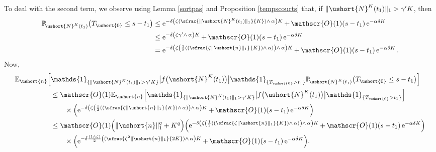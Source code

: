 \documentclass[10pt]{amsart}
\newcommand{\Psfrac}[2]{(\sfrac{#1}{#2})}
\let\mathcal\mathscr
\numberwithin{equation}{section}
\theoremstyle{plain}
\theoremstyle{definition}
\newcommand{\proba}{{\mathbb{P}}}
\newcommand{\E}{{\mathbb{E}}}
\newcommand{\Oun}{\mathcal{O}(1)}
\newcommand{\un}{\mathds{1}}
\newcommand{\vecn}{\ushort{n}}
\newcommand{\veczer}{\ushort{0}}
\newcommand{\leproc}{\ushort{N}^{K}}
\newcommand{\sleproc}{\ushort{N}^{K}}
\newcommand{\e}{\operatorname{e}}
\newcommand{\norm}[1]{\|#1\|_{1}}\let\snorm\norm
\begin{document}
To deal with the second term, we observe using Lemma \ref{sortpas} and Proposition \ref{tempscourts} that,
if $\|\leproc(t_{1})\|_1> \gamma' K$, then
\begin{align*}
\proba_{\!\sleproc(t_{1})}\bigl(T_{\veczer}\le s-t_{1}\bigr)
& \le \e^{-\delta\left(\zeta\Psfrac{\|\sleproc(t_{1})\|_{1}}{K}\wedge\,\alpha\right)K}+\,\Oun (s-t_{1})\e^{-\alpha\delta K}\\
& \leq \e^{-\delta\left(\zeta\gamma'\wedge\,\alpha\right)K}+\,\Oun (s-t_{1})\e^{-\alpha\delta K}\\
& =\e^{-\delta\left(\zeta\left(\frac{1}{2} \left(\Psfrac{\zeta \|\vecn\|_{1}}{K} \wedge\, \alpha \right)\right)\wedge\,\alpha\right)K}+\,\Oun (s-t_{1})\e^{-\alpha\delta K}.
\end{align*}
Now,
\begin{align*}
\E_{\vecn}\Bigl[&\un_{\{\|\sleproc(t_{1})\|_1> \gamma' K\}}
\big|f\bigl(\leproc(t_{1})\bigr)\big|\un_{\{T_{\veczer}>t_{1}\}}
\proba_{\!\sleproc(t_{1})}\bigl(T_{\veczer}\le s-t_{1}\bigr)\Bigr]\\
& \leq \Oun \E_{\vecn}\Bigl[\un_{\{\|\sleproc(t_{1})\|_1> \gamma' K\}}
\big|f\bigl(\leproc(t_{1})\bigr)\big|\un_{\{T_{\veczer}>t_{1}\}}
\Bigr]\\
& \qquad\times \Bigl(\e^{-\delta\left(\zeta\left(\frac{1}{2} \left(\Psfrac{\zeta \|\vecn\|_{1}}{K} \wedge\, \alpha\right)\right)
\wedge\,\alpha\right)K}+\,\Oun (s-t_{1})\e^{-\alpha\delta K}\Bigr)\\
& \leq \Oun \Bigl(\norm{\vecn}^{q}+K^{q}\Bigr) \Bigl(\e^{-\delta\left(\zeta\left(\frac{1}{2} \left(\Psfrac{\zeta \|\vecn\|_{1}}{K}
\wedge\, \alpha\right)\right)\wedge\,\alpha\right)K}+\,\Oun (s-t_{1})\e^{-\alpha\delta K}\Bigr)\\
&
\qquad \times \Bigl(\e^{-\delta \frac{(1\wedge \zeta)}{2} \left(\Psfrac{\zeta^2 \|\vecn\|_{1}}{2K} \wedge\, \alpha\right)K}+\,
\Oun (s-t_{1})\e^{-\alpha\delta K}\Bigr).
\end{align*}
\end{document}
